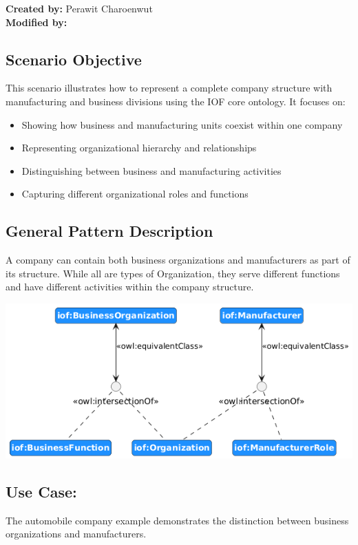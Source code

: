 \label{chapter-scenario-template}
\textbf{Created by:} Perawit Charoenwut \\
\textbf{Modified by:}

\subsection*{Scenario Objective}
This scenario illustrates how to represent a complete company structure with manufacturing and business divisions using the IOF core ontology. It focuses on:
\begin{itemize}
    \item Showing how business and manufacturing units coexist within one company
    \item Representing organizational hierarchy and relationships
    \item Distinguishing between business and manufacturing activities
    \item Capturing different organizational roles and functions
\end{itemize}

\subsection*{General Pattern Description}
A company can contain both business organizations and manufacturers as part of its structure. While all are types of Organization, they serve different functions and have different activities within the company structure.

\includegraphics[scale=0.5]{scenarios/different-type-organizations/image/different-type-organizations-schema}

\subsection*{Use Case: }

The automobile company example demonstrates the distinction between business organizations and manufacturers.

